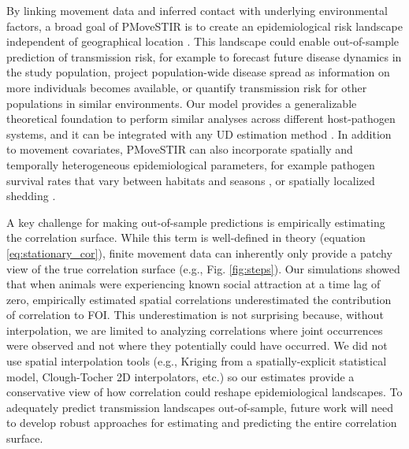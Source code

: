 \documentclass[letterpaper]{article}
\begin{document}
By linking movement data and inferred contact with underlying environmental factors, a broad goal of PMoveSTIR is to create an epidemiological risk landscape independent of geographical location \citep{Merkle2018,Manlove2022}. This landscape could enable out-of-sample prediction of transmission risk, for example to forecast future disease dynamics in the study population, project population-wide disease spread as information on more individuals becomes available, or quantify transmission risk for other populations in similar environments. Our model provides a generalizable theoretical foundation to perform similar analyses across different host-pathogen systems, and it can be integrated with any UD estimation method \citep{Signer2017,Merkle2018,Michelot2020,Potts2023}. In addition to movement covariates, PMoveSTIR can also incorporate spatially and temporally heterogeneous epidemiological parameters, for example pathogen survival rates that vary between habitats and seasons \citep{Daversa2017}, or spatially localized shedding \citep{Weinstein2018a}.


A key challenge for making out-of-sample predictions is empirically estimating the correlation surface.  While this term is well-defined in theory (equation \ref{eq:stationary_cor}), finite movement data can inherently only provide a patchy view of the true correlation surface (e.g., Fig. \ref{fig:steps}).  Our simulations showed that when animals were experiencing known social attraction at a time lag of zero, empirically estimated spatial correlations underestimated the contribution of correlation to FOI. This underestimation is not surprising because, without interpolation, we are limited to analyzing correlations where joint occurrences were observed and not where they potentially could have occurred. We did not use spatial interpolation tools (e.g., Kriging from a spatially-explicit statistical model, Clough-Tocher 2D interpolators, etc.) so our estimates provide a conservative view of how correlation could reshape epidemiological landscapes.  To adequately predict transmission landscapes out-of-sample, future work will need to develop robust approaches for estimating and predicting the entire correlation surface. 
\end{document}
